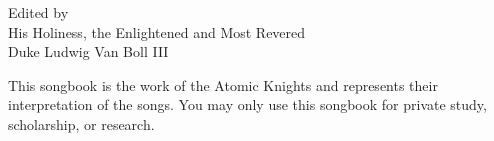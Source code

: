 \documentclass[11pt,a5paper,wordbk]{../SSSongbook}
\begin{document}
\let\cleardoublepage\clearpage %

{Edited by\\
  His Holiness, the Enlightened and Most Revered\\
Duke Ludwig Van Boll III}

\ifChordBk
\let\cleardoublepage\clearpage %
\fancyhead[R,L]{}
\tableofcontents %
\vfil
This songbook is the work of the Atomic Knights
and represents their interpretation of the songs.
You may only use this songbook for private study,
scholarship, or research.\par
\pagebreak
\fi







\ifChordBk
\printindex
\fi
\end{document}
